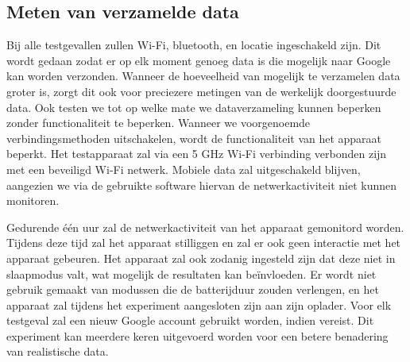 \subsection{Meten van verzamelde data}
Bij alle testgevallen zullen Wi-Fi, bluetooth, en locatie ingeschakeld zijn. Dit wordt gedaan zodat er op elk moment genoeg data is die mogelijk naar Google kan worden verzonden. Wanneer de hoeveelheid van mogelijk te verzamelen data groter is, zorgt dit ook voor preciezere metingen van de werkelijk doorgestuurde data. Ook  testen we tot op welke mate we dataverzameling kunnen beperken zonder functionaliteit te beperken. Wanneer we voorgenoemde verbindingsmethoden uitschakelen, wordt de functionaliteit van het apparaat beperkt. Het testapparaat zal via een 5 GHz Wi-Fi verbinding verbonden zijn met een beveiligd Wi-Fi netwerk. Mobiele data zal uitgeschakeld blijven, aangezien we via de gebruikte software hiervan de netwerkactiviteit niet kunnen monitoren.

Gedurende één uur zal de netwerkactiviteit van het apparaat gemonitord worden. Tijdens deze tijd zal het apparaat stilliggen en zal er ook geen interactie met het apparaat gebeuren. Het apparaat zal ook zodanig ingesteld zijn dat deze niet in slaapmodus valt, wat mogelijk de resultaten kan beïnvloeden. Er wordt niet gebruik gemaakt van modussen die de batterijduur zouden verlengen, en het apparaat zal tijdens het experiment aangesloten zijn aan zijn oplader. Voor elk testgeval zal een nieuw Google account gebruikt worden, indien vereist. Dit experiment kan meerdere keren uitgevoerd worden voor een betere benadering van realistische data.




